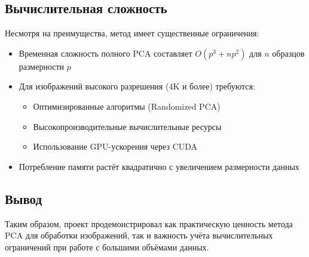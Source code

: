 \documentclass[14pt]{extarticle}
\begin{document}
\subsection{Вычислительная сложность}
Несмотря на преимущества, метод имеет существенные ограничения:
\begin{itemize}
    \item Временная сложность полного PCA составляет $O(p^3 + np^2)$ для $n$ образцов размерности $p$
    
    \item Для изображений высокого разрешения (4K и более) требуются:
    \begin{itemize}
        \item Оптимизированные алгоритмы (Randomized PCA)
        \item Высокопроизводительные вычислительные ресурсы
        \item Использование GPU-ускорения через CUDA
    \end{itemize}
    
    \item Потребление памяти растёт квадратично с увеличением размерности данных
\end{itemize}
\subsection{Вывод}
Таким образом, проект продемонстрировал как практическую ценность метода PCA для обработки изображений, так и важность учёта вычислительных ограничений при работе с большими объёмами данных.
\end{document}
